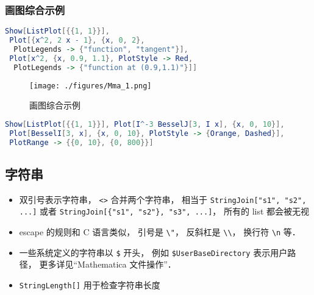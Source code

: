 \subsubsection{画图综合示例}
\begin{lstlisting}[language=Mathematica]
Show[ListPlot[{{1, 1}}],
 Plot[{x^2, 2 x - 1}, {x, 0, 2},
  PlotLegends -> {"function", "tangent"}],
 Plot[x^2, {x, 0.9, 1.1}, PlotStyle -> Red, 
  PlotLegends -> {"function at (0.9,1.1)"}]]
\end{lstlisting}
\begin{figure}[ht]
\centering
\texttt{[image: ./figures/Mma\_1.png]}
\caption{画图综合示例} \label{Mma_fig1}
\end{figure}

\begin{lstlisting}[language=Mathematica]
Show[ListPlot[{{1, 1}}], Plot[I^-3 BesselJ[3, I x], {x, 0, 10}], 
 Plot[BesselI[3, x], {x, 0, 10}, PlotStyle -> {Orange, Dashed}], 
 PlotRange -> {{0, 10}, {0, 800}}]
\end{lstlisting}

\subsection{字符串}
\begin{itemize}
\item 双引号表示字符串， \verb|<>| 合并两个字符串， 相当于 \verb|StringJoin["s1", "s2", ...]| 或者 \verb|StringJoin[{"s1", "s2"}, "s3", ...]|， 所有的 list 都会被无视
\item escape 的规则和 C 语言类似， 引号是 \verb|\"|， 反斜杠是 \verb|\\|， 换行符 \verb|\n| 等．
\item 一些系统定义的字符串以 \verb|$| 开头， 例如 \verb|$UserBaseDirectory| 表示用户路径， 更多详见“Mathematica 文件操作”．
\item \verb|StringLength[]| 用于检查字符串长度
\end{itemize}

